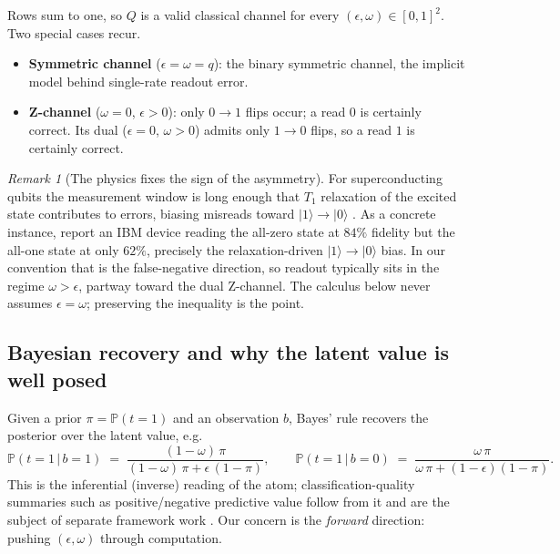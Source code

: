 \documentclass[12pt]{article}
\numberwithin{equation}{section}
\theoremstyle{plain}
\theoremstyle{definition}
\theoremstyle{remark}
\newtheorem{remark}[theorem]{Remark}
\newcommand{\eps}{\epsilon}
\newcommand{\Prob}{\mathbb{P}}
\newcommand{\given}{\,\vert\,}
\newcommand{\ket}[1]{\lvert #1 \rangle}
\begin{document}
Rows sum to one, so $Q$ is a valid classical channel for every
$(\eps,\omega)\in[0,1]^2$. Two special cases recur.

\begin{itemize}[leftmargin=1.4em]
  \item \textbf{Symmetric channel} ($\eps=\omega=q$): the binary symmetric
        channel, the implicit model behind single-rate readout error.
  \item \textbf{Z-channel} ($\omega=0$, $\eps>0$): only $0\!\to\!1$ flips occur;
        a read $0$ is certainly correct. Its dual ($\eps=0$, $\omega>0$) admits
        only $1\!\to\!0$ flips, so a read $1$ is certainly correct.
\end{itemize}

\begin{remark}[The physics fixes the sign of the asymmetry]
\label{rem:t1}
For superconducting qubits the measurement window is long enough that $T_1$
relaxation of the excited state contributes to errors, biasing misreads toward
$\ket{1}\!\to\!\ket{0}$ \citep{tannu2019mitigating,hicks2021readout}. As a
concrete instance, \citet{tannu2019mitigating} report an IBM device reading the
all-zero state at $84\%$ fidelity but the all-one state at only $62\%$, precisely
the relaxation-driven $\ket{1}\!\to\!\ket{0}$ bias. In our
convention that is the false-negative direction, so readout typically sits in the
regime $\omega > \eps$, partway toward the dual Z-channel. The calculus below
never assumes $\eps=\omega$; preserving the inequality is the point.
\end{remark}

\subsection{Bayesian recovery and why the latent value is well posed}

Given a prior $\pi=\Prob(t=1)$ and an observation $b$, Bayes' rule recovers the
posterior over the latent value, e.g.
\begin{equation}
\label{eq:bayes}
  \Prob(t=1\given b=1) \;=\;
  \frac{(1-\omega)\,\pi}{(1-\omega)\,\pi + \eps\,(1-\pi)},
  \qquad
  \Prob(t=1\given b=0) \;=\;
  \frac{\omega\,\pi}{\omega\,\pi + (1-\eps)(1-\pi)} .
\end{equation}
This is the inferential (inverse) reading of the atom; classification-quality
summaries such as positive/negative predictive value follow from it and are the
subject of separate framework work \citep{bernoulliMeasures}. Our concern is the
\emph{forward} direction: pushing $(\eps,\omega)$ through computation.
\end{document}
